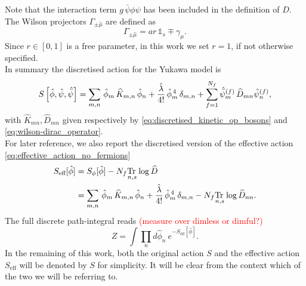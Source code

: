 Note that the interaction term $g\, \bar\psi\phi\psi$ has been included in the definition of $D$. \\
The Wilson projectors $\Gamma_{\pm \hat \mu}$ are defined as
\begin{equation*}
    \Gamma_{\pm \hat \mu} = ar \, \mathds{1}_s \mp \gamma_\mu.
\end{equation*}
Since $r \in [0,1]$ is a free parameter, in this work we set $r=1$, if not otherwise specified. \\
In summary the discretised action for the Yukawa model is 
\begin{equation*}
    S\left[\hat{\phi}, \hat{\psi}, \hat{\bar{\psi}} \right] = \sum_{m,n} \, \hat{\phi}_m \, \widehat{K}_{m,n} \, \hat{\phi}_n + \frac{\hat{\lambda}}{4!} \, \hat{\phi}_m^{\,4} \, \delta_{m,n} + \sum_{f=1}^{N_f}\hat{\bar{\psi}}_m^{(f)} \, \widehat{D}_{mn} \hat{\psi}_n^{(f)},
\end{equation*}
with $\widehat{K}_{mn}, \widehat{D}_{mn}$ given respectively by \eqref{eq:discretised_kinetic_op_bosons} and \eqref{eq:wilson-dirac_operator}. \\
For later reference, we also report the discretised version of the effective action \eqref{eq:effective_action_no_fermions}
\begin{equation}
	\begin{aligned}
		S_\text{eff}[\hat\phi] 	&= S_\phi[\hat\phi] - N_f \underset{n,s}{\operatorname{\text{Tr} \,}} \log \widehat{D} \\
							&= \sum_{m,n} \, \hat{\phi}_m \, \widehat{K}_{m,n} \, \hat{\phi}_n + \frac{\hat{\lambda}}{4!} \, \hat{\phi}_m^{\,4} \, \delta_{m,n} - N_f \underset{n,s}{\operatorname{\text{Tr} \,}} \log \widehat{D}_{nn}.
	\end{aligned}
	\label{eq:discretised_effective_action}
\end{equation}
The full discrete path-integral reads \textcolor{red}{(measure over dimless or dimful?)}
\begin{equation}
    Z = \int \prod_n d\hat\phi_n \ e^{-S_\text{eff}[\hat\phi]}.
    \label{eq:discretised_path_integral}
\end{equation}
In the remaining of this work, both the original action $S$ and the effective action $S_\text{eff}$ will be denoted by $S$ for simplicity. It will be clear from the context which of the two we will be referring to.


